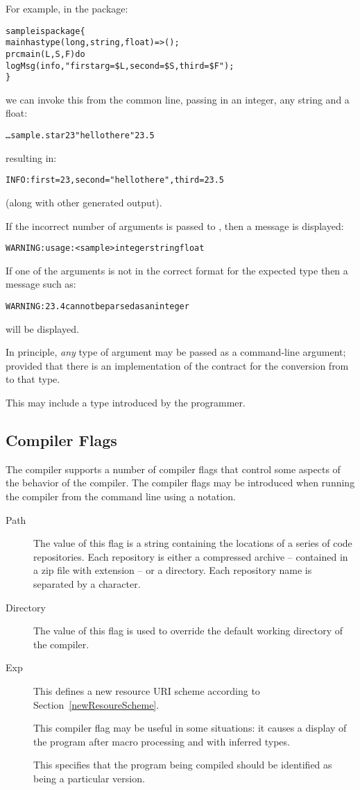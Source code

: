 For example, in the  package:
\begin{alltt}
sample is package\{
  main has type (long,string,float)=>();
  prc main(L,S,F) do
    logMsg(info,"first arg=\$L, second=\$S, third=\$F");
\}
\end{alltt}
we can invoke this from the common line, passing in an integer, any string and a float:
\begin{alltt}
\ldots sample.star 23 "hello there" 23.5
\end{alltt}
resulting in:
\begin{alltt}
INFO: first=23, second="hello there", third=23.5
\end{alltt}
(along with other generated output).

If the incorrect number of arguments is passed to , then a message is displayed:
\begin{alltt}
WARNING: usage: <sample> integer string float
\end{alltt}
If one of the arguments is not in the correct format for the expected type then a message such as:
\begin{alltt}
WARNING: 23.4 cannot be parsed as an integer
\end{alltt}
will be displayed.
\begin{aside}
In principle, \emph{any} type of argument may be passed as a command-line argument; provided that there is an implementation of the  contract for the conversion from  to that type. 

This may include a type introduced by the programmer.
\end{aside}

\subsection{Compiler Flags}
\label{compileFlags}
The compiler supports a number of compiler flags that control some aspects of the behavior of the compiler. The compiler flags may be introduced when running the compiler from the command line using a  notation.
\begin{description}
\item[Path] The value of this flag is a string containing the locations of a series of code repositories. Each repository is either a compressed archive -- contained in a zip file with extension  -- or a directory. Each repository name is separated by a \q{:} character.
\item[Directory] The value of this flag is used to override the default working directory of the compiler.
\item[Exp] This defines a new resource URI scheme according to Section~\vref{newResoureScheme}.
\item[] This compiler flag may be useful in some situations: it causes a display of the program after macro processing and with inferred types. 
\item[] This specifies that the program being compiled should be identified as being a particular version.
\end{description}
